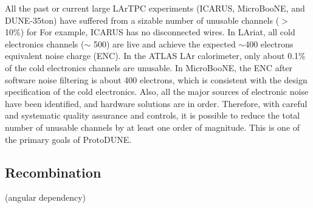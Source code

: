 All the past or current large LArTPC experiments (ICARUS, MicroBooNE, and DUNE-35ton) have suffered from a sizable
number of unusable channels ($>$ 10\%) for %
For example, ICARUS has no disconnected wires. In LAriat, all cold electronics channels ($\sim$ 500) are live and achieve the expected $\sim$400 electrons equivalent noise charge (ENC). In the ATLAS LAr calorimeter, only about 0.1\% of the cold electronics channels are unusable. 
In MicroBooNE, the ENC after software noise filtering is about 400 electrons, which is consistent with the design specification of the cold electronics. Also, all the major sources of electronic noise
have been identified, and hardware solutions are in order. Therefore, with careful and systematic quality assurance and controls, it is possible to reduce the total number of unusable channels
by at least one order of magnitude. This is one of the primary goals of ProtoDUNE.




	\subsection{Recombination}
	 (angular dependency)


